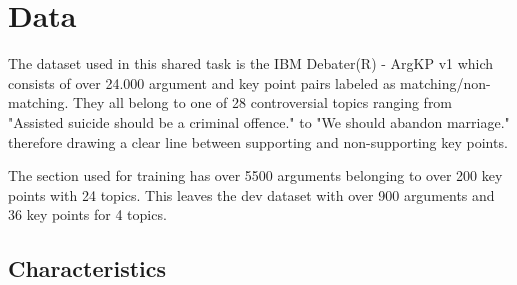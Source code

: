\section{Data}\label{data}

The dataset used in this shared task is the IBM Debater(R) - ArgKP v1 \cite{Bar-HaimEFKLS2020} which consists of over 
24.000 argument and key point pairs labeled as matching/non-matching.
They all belong to one of 28 controversial topics ranging from "Assisted suicide should be a criminal offence." to 
"We should abandon marriage." therefore drawing a clear line between supporting and non-supporting key points.

The section used for training has over 5500 arguments belonging to over 200 key points with 24 topics. This leaves the 
dev dataset with over 900 arguments and 36 key points for 4 topics.

\subsection{Characteristics}

